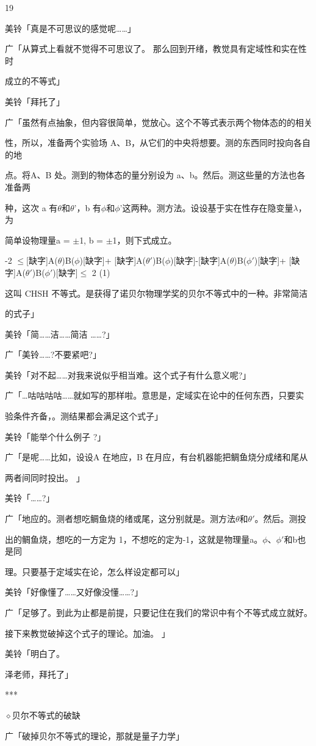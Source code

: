 19\par
美铃「真是不可思议的感觉呢……」\par
广「从算式上看就不觉得不可思议了。 那么回到开绪，教觉具有定域性和实在性时\par
成立的不等式」\par
美铃「拜托了」\par
广「虽然有点抽象，但内容很简单，觉放心。这个不等式表示两个物体态的的相关\par
性，所以，准备两个实验场 A、B，从它们的中央将想要。测的东西同时投向各自的地\par
点。将A、B 处。测到的物体态的量分别设为 a、b。然后。测这些量的方法也各准备两\par
种，这次 a 有$\theta$和$\theta$'，b 有$\phi$和$\phi$'这两种。测方法。设设基于实在性存在隐变量$\lambda$，为\par
简单设物理量a = $\pm$1, b = $\pm$1，则下式成立。\par
-2 $\leq$[缺字]A($\theta$)B($\phi$)[缺字]+ [缺字]A($\theta$$\prime$)B($\phi$)[缺字]-[缺字]A($\theta$)B($\phi$$\prime$)[缺字]+ [缺字]A($\theta$$\prime$)B($\phi$$\prime$)[缺字]$\leq$ 2 (1)\par
这叫 CHSH 不等式。是获得了诺贝尔物理学奖的贝尔不等式中的一种。非常简洁\par
的式子」\par
美铃「简……洁……简洁 ……?」\par
广「美铃……?不要紧吧?」\par
美铃「对不起……对我来说似乎相当难。这个式子有什么意义呢?」\par
广「…咕咕咕咕……就如写的那样啦。意思是，定域实在论中的任何东西，只要实\par
验条件齐备，。测结果都会满足这个式子」\par
美铃「能举个什么例子 ?」\par
广「是呢……比如，设设A 在地应，B 在月应，有台机器能把鲷鱼烧分成绪和尾从\par
两者间同时投出。 」\par
美铃「……?」\par
广「地应的。测者想吃鲷鱼烧的绪或尾，这分别就是。测方法$\theta$和$\theta$$\prime$。然后。测投\par
出的鲷鱼烧，想吃的一方定为 1，不想吃的定为-1，这就是物理量a。$\phi$、$\phi$$\prime$和b也是同\par
理。只要基于定域实在论，怎么样设定都可以」\par
美铃「好像懂了……又好像没懂……?」\par
广「足够了。到此为止都是前提，只要记住在我们的常识中有个不等式成立就好。\par
接下来教觉破掉这个式子的理论。加油。 」\par
美铃「明白了。\par
泽老师，拜托了」\par
***\par
$\diamond$贝尔不等式的破缺\par
广「破掉贝尔不等式的理论，那就是量子力学」\par

